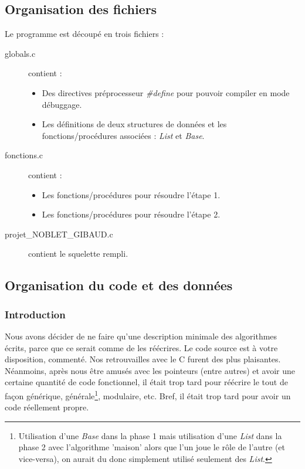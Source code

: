 \documentclass[a4paper,10pt]{report}
\begin{document}
\subsection{Organisation des fichiers}
Le programme est découpé en trois fichiers :
\begin{description}
\item[globals.c] contient :
  \begin{itemize}
  \item Des directives préprocesseur \emph{\#define} pour pouvoir compiler en mode débuggage.
  \item Les définitions de deux structures de données et les fonctions/procédures associées : \emph{List} et \emph{Base}.
  \end{itemize}
\item[fonctions.c] contient :
  \begin{itemize}
  \item Les fonctions/procédures pour résoudre l'étape 1.
  \item Les fonctions/procédures pour résoudre l'étape 2.
  \end{itemize}
\item[projet\_NOBLET\_GIBAUD.c] contient le squelette rempli.
\end{description}
    
\subsection{Organisation du code et des données}

\subsubsection{Introduction}
Nous avons décider de ne faire qu'une description minimale des algorithmes écrits,
parce que ce serait comme de les réécrires.
Le code source est à votre disposition, commenté.
Nos retrouvailles avec le C furent des plus plaisantes.
Néanmoins, après nous être amusés avec les pointeurs (entre autres) et avoir une certaine quantité de code fonctionnel,
il était trop tard pour réécrire le tout de façon générique,
générale\footnote{Utilisation d'une \emph{Base} dans la phase 1 mais utilisation d'une \emph{List} dans la phase 2
  avec l'algorithme 'maison' alors que l'un joue le rôle de l'autre (et vice-versa), on aurait du donc simplement
  utilisé seulement des \emph{List}.}, modulaire, etc. Bref, il était trop tard pour avoir un code réellement propre.
\end{document}
